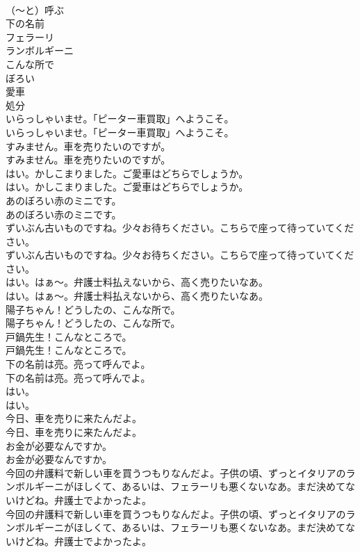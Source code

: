\documentclass[8pt]{extreport}
\begin{document}
\begin{CJK}{UTF8}{min}
\\	（～と）呼ぶ
\\	下の名前
\\	フェラーリ
\\	ランボルギーニ
\\	こんな所で
\\	ぼろい
\\	愛車
\\	処分
\\	いらっしゃいませ。「ピーター車買取」へようこそ。	
\\	いらっしゃいませ。「ピーター車買取」へようこそ。 
\\	すみません。車を売りたいのですが。	
\\	すみません。車を売りたいのですが。 
\\	はい。かしこまりました。ご愛車はどちらでしょうか。	
\\	はい。かしこまりました。ご愛車はどちらでしょうか。 
\\	あのぼろい赤のミニです。	
\\	あのぼろい赤のミニです。 
\\	ずいぶん古いものですね。少々お待ちください。こちらで座って待っていてください。	
\\	ずいぶん古いものですね。少々お待ちください。こちらで座って待っていてください。 
\\	はい。はぁ～。弁護士料払えないから、高く売りたいなあ。	
\\	はい。はぁ～。弁護士料払えないから、高く売りたいなあ。 
\\	陽子ちゃん！どうしたの、こんな所で。	
\\	陽子ちゃん！どうしたの、こんな所で。 
\\	戸鍋先生！こんなところで。	
\\	戸鍋先生！こんなところで。 
\\	下の名前は亮。亮って呼んでよ。	
\\	下の名前は亮。亮って呼んでよ。 
\\	はい。	
\\	はい。 
\\	今日、車を売りに来たんだよ。	
\\	今日、車を売りに来たんだよ。 
\\	お金が必要なんですか。	
\\	お金が必要なんですか。 
\\	今回の弁護料で新しい車を買うつもりなんだよ。子供の頃、ずっとイタリアのランボルギーニがほしくて、あるいは、フェラーリも悪くないなあ。まだ決めてないけどね。弁護士でよかったよ。	
\\	今回の弁護料で新しい車を買うつもりなんだよ。子供の頃、ずっとイタリアのランボルギーニがほしくて、あるいは、フェラーリも悪くないなあ。まだ決めてないけどね。弁護士でよかったよ。 

\end{CJK}
\end{document}
